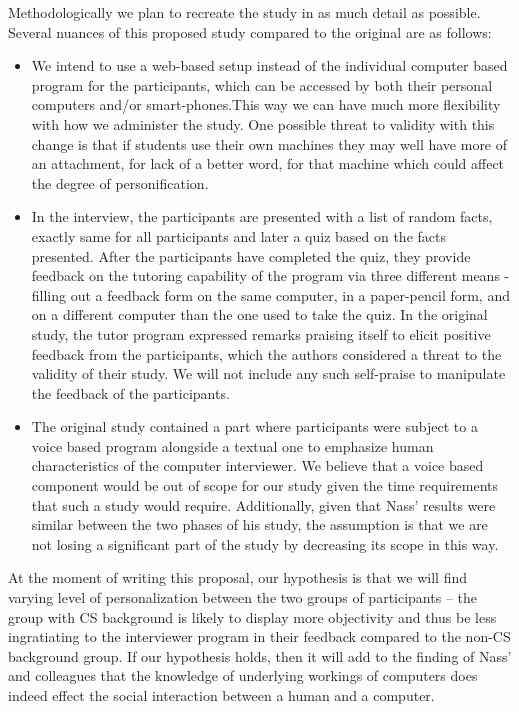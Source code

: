 \documentclass[english]{article}
\begin{document}
Methodologically we plan to recreate the study in as much detail as possible. Several nuances of this proposed study compared to the original are as follows:

\begin{itemize}
    \item We intend to use a web-based setup instead of the individual computer based program for the participants, which can be accessed by both their personal computers and/or smart-phones.This way we can have much more flexibility with how we administer the study. One possible threat to validity with this change is that if students use their own machines they may well have more of an attachment, for lack of a better word, for that machine which could affect the degree of personification. 
    
    \item In the interview, the participants are presented with a list of random facts, exactly same for all participants and later a quiz based on the facts presented. After the participants have completed the quiz, they provide feedback on the tutoring capability of the program via three different means - filling out a feedback form on the same computer, in a paper-pencil form, and on a different computer than the one used to take the quiz. In the original study, the tutor program expressed remarks praising itself to elicit positive feedback from the participants, which the authors considered a threat to the validity of their study. We will not include any such self-praise to manipulate the feedback of the participants.
    
    \item The original study contained a part where participants were subject to a voice based program alongside a textual one to emphasize human characteristics of the computer interviewer. We believe that a voice based component would be out of scope for our study given the time requirements that such a study would require.  Additionally, given that Nass' results were similar between the two phases of his study, the assumption is that we are not losing a significant part of the study by decreasing its scope in this way.
\end{itemize}

At the moment of writing this proposal, our hypothesis is that we will find varying level of personalization between the two groups of participants -- the group with CS background is likely to display more objectivity and thus be less ingratiating to the interviewer program in their feedback compared to the non-CS background group. If our hypothesis holds, then it will add to the finding of Nass' and colleagues that the knowledge of underlying workings of computers does indeed effect the social interaction between a human and a computer.

{}

\end{document}
